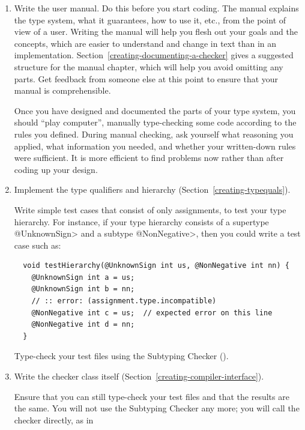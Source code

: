 \begin{enumerate}
\item
\label{creating-tips-write-manual}
  Write the user manual.  Do this before you start coding.  The manual
  explains the type system, what it guarantees, how to use it, etc., from
  the point of view of a user.  Writing the manual will help you flesh out
  your goals and the concepts, which are easier to understand and change in
  text than in an implementation.
  Section~\ref{creating-documenting-a-checker} gives a suggested structure
  for the manual chapter, which will help you avoid omitting any parts.
  Get feedback from someone else at this point to ensure that your manual
  is comprehensible.

  Once you have designed and documented the parts of your type system, you
  should ``play computer'', manually
  type-checking some code according to the rules you defined.
  During manual checking, ask
  yourself what reasoning you applied, what information you needed, and
  whether your written-down rules were sufficient.
  It is more efficient to find problems now rather than after coding up
  your design.

\item
\label{creating-tips-implement-qualifiers}
  Implement the type qualifiers and hierarchy
  (Section~\ref{creating-typequals}).

  Write simple test cases that consist of only assignments,
  to test your type hierarchy.  For instance, if
  your type hierarchy consists of a supertype \<@UnknownSign> and a subtype
  \<@NonNegative>, then you could write a test case such as:

\begin{Verbatim}
  void testHierarchy(@UnknownSign int us, @NonNegative int nn) {
    @UnknownSign int a = us;
    @UnknownSign int b = nn;
    // :: error: (assignment.type.incompatible)
    @NonNegative int c = us;  // expected error on this line
    @NonNegative int d = nn;
  }
\end{Verbatim}

  Type-check your test files using the Subtyping Checker
  ().

\item
\label{creating-tips-implement-checker}
  Write the checker class itself
  (Section~\ref{creating-compiler-interface}).

  Ensure that you can still type-check your test files and that the results
  are the same.  You will not use the Subtyping Checker any more; you will
  call the checker directly, as in


\end{enumerate}
